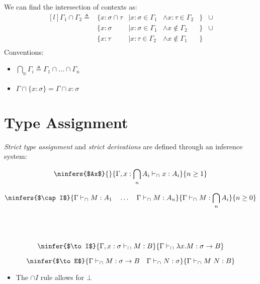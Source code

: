 We can find the intersection of contexts as:
\[\begin{matrix*}[l]
    \Gamma_1 \cap \Gamma_2 \triangleq & \{x: \sigma \cap \tau &| x:\sigma \in \Gamma_1 & \land x:\tau \in \Gamma_2 &\} & \cup \\
     & \{x : \sigma &| x : \sigma \in \Gamma_1 & \land x \not\in \Gamma_2 &\} & \cup \\
     & \{x : \tau &| x : \tau \in \Gamma_2 & \land x \not\in \Gamma_1 &\} & \\
\end{matrix*}\]
Conventions:
\begin{itemize}
    \item $\bigcap_{\underline{n}}\Gamma_i \triangleq \Gamma_1 \cap \dots \cap \Gamma_n$
    \item $\Gamma \cap \{x:\sigma\} = \Gamma \cap x:\sigma$
\end{itemize}

\section{Type Assignment}
\textit{Strict type assignment} and \textit{strict derivations} are defined through an inference system:
\\ \begin{minipage}{.5\textwidth}
    \[\ninfers{$Ax$}{}{\Gamma, x: \bigcap_nA_i \vdash_\cap x : A_i}{n \geq 1}\]
\end{minipage}
\begin{minipage}{.5\textwidth}
    \[\ninfers{$\cap I$}{\Gamma \vdash_\cap M:A_1 \quad \dots \quad \Gamma \vdash_\cap M : A_n }{\Gamma \vdash_\cap M : \bigcap_nA_i}{n \geq 0}\]
\end{minipage}
\\ \vspace{2mm}
\\ \begin{minipage}{.5\textwidth}
    \[\ninfer{$\to I$}{
        \Gamma, x: \sigma \vdash_\cap M : B
    }{
        \Gamma \vdash_\cap \lambda x . M : \sigma \to B
    }\]
\end{minipage}
\begin{minipage}{.5\textwidth}
    \[\ninfer{$\to E$}{
        \Gamma \vdash_\cap M : \sigma \to B \quad \Gamma \vdash_\cap N : \sigma
    }{
        \Gamma \vdash_\cap M \ N : B
    }\]
\end{minipage}
\begin{itemize}
    \item The $\cap I$ rule allows for $\bot$
\end{itemize}

